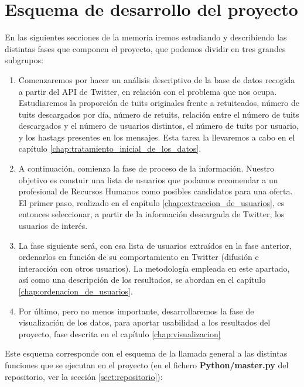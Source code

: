 \section{Esquema de desarrollo del proyecto}
En las siguientes secciones de la memoria iremos estudiando y describiendo las distintas
fases que componen el proyecto, que podemos dividir en tres grandes subgrupos:
\begin{enumerate}
\item Comenzaremos por hacer un análisis descriptivo de la base de datos recogida a partir del API de Twitter, en relación con el problema que nos ocupa. Estudiaremos la proporción de tuits originales
frente a retuiteados, número de tuits descargados por día, número de retuits, relación entre el 
número de tuits descargados y el número de usuarios distintos, el número de tuits por usuario, y
los hastags presentes en los mensajes. Esta tarea la llevaremos a cabo en el capítulo \ref{chap:tratamiento_inicial_de_los_datos}.

\item A continuación, comienza la fase de proceso de la información. Nuestro objetivo es 
constuir una lista de usuarios que podamos recomendar a un profesional de Recursos Humanos como
posibles candidatos para una oferta. El primer paso, realizado en el capítulo \ref{chap:extraccion_de_usuarios}, es entonces seleccionar, a partir de la información descargada de Twitter, los usuarios de interés. 

\item La fase siguiente será, con esa lista de usuarios extraídos en la fase anterior, ordenarlos
en función de su comportamiento en Twitter (difusión e interacción con otros usuarios). 
La metodología empleada en este apartado, así como una descripción de los resultados, 
se abordan en el capítulo \ref{chap:ordenacion_de_usuarios}.

\item Por último, pero no menos importante, desarrollaremos la fase de visualización de los
datos, para aportar usabilidad a los resultados del proyecto, fase descrita en el
capítulo \ref{chap:visualizacion}
\end{enumerate}

Este esquema corresponde con el esquema de la llamada general a las distintas funciones que se
ejecutan en el proyecto (en el fichero {\bf Python/master.py} del repositorio, ver la sección
\ref{sect:repositorio}):

